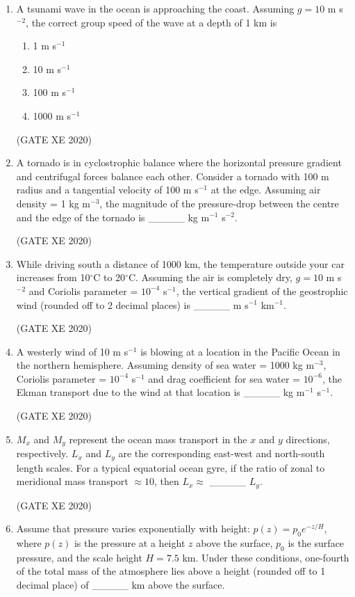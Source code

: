 \documentclass[12pt]{article}
\begin{document}
\begin{enumerate}
\item A tsunami wave in the ocean is approaching the coast. Assuming $g = 10$ m s$^{-2}$, the correct group speed of the wave at a depth of 1 km is
\begin{enumerate}
\item 1 m s$^{-1}$
\item 10 m s$^{-1}$
\item 100 m s$^{-1}$
\item 1000 m s$^{-1}$
\end{enumerate}
(GATE XE 2020)

\item A tornado is in cyclostrophic balance where the horizontal pressure gradient and centrifugal forces balance each other. Consider a tornado with 100 m radius and a tangential velocity of 100 m s$^{-1}$ at the edge. Assuming air density = 1 kg m$^{-3}$, the magnitude of the pressure-drop between the centre and the edge of the tornado is \_\_\_\_\_ kg m$^{-1}$ s$^{-2}$.  

(GATE XE 2020)

\item While driving south a distance of 1000 km, the temperature outside your car increases from 10$^\circ$C to 20$^\circ$C. Assuming the air is completely dry, $g = 10$ m s$^{-2}$ and Coriolis parameter = $10^{-4}$ s$^{-1}$, the vertical gradient of the geostrophic wind (rounded off to 2 decimal places) is \_\_\_\_\_ m s$^{-1}$ km$^{-1}$.  

(GATE XE 2020)

\item A westerly wind of 10 m s$^{-1}$ is blowing at a location in the Pacific Ocean in the northern hemisphere. Assuming density of sea water = 1000 kg m$^{-3}$, Coriolis parameter = $10^{-4}$ s$^{-1}$ and drag coefficient for sea water = $10^{-6}$, the Ekman transport due to the wind at that location is \_\_\_\_\_ kg m$^{-1}$ s$^{-1}$.

(GATE XE 2020)

\item $M_x$ and $M_y$ represent the ocean mass transport in the $x$ and $y$ directions, respectively. $L_x$ and $L_y$ are the corresponding east-west and north-south length scales. For a typical equatorial ocean gyre, if the ratio of zonal to meridional mass transport $\approx 10$, then $L_x \approx$ \_\_\_\_\_ $L_y$.  

(GATE XE 2020)

\item Assume that pressure varies exponentially with height: $p(z) = p_0 e^{-z/H}$, where $p(z)$ is the pressure at a height $z$ above the surface, $p_0$ is the surface pressure, and the scale height $H = 7.5$ km. Under these conditions, one-fourth of the total mass of the atmosphere lies above a height (rounded off to 1 decimal place) of \_\_\_\_\_ km above the surface.  


\end{enumerate}
\end{document}
